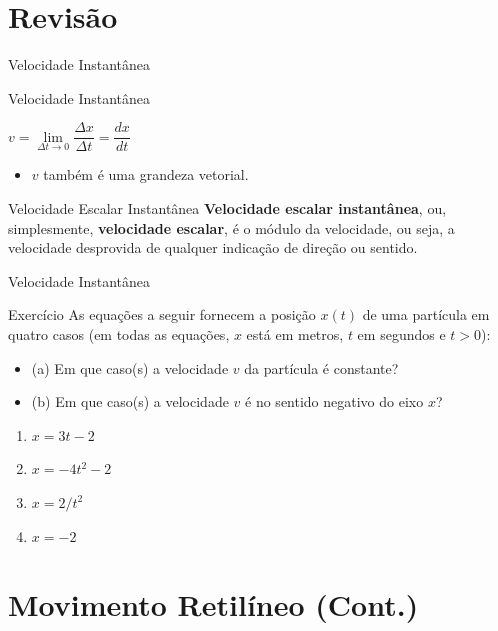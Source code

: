 \documentclass[xcolor=dvipsnames,table]{beamer}
\begin{document}
	\section{Revisão}
	\begin{frame}{Velocidade Instantânea}
		\begin{block}{Velocidade Instantânea}
			\begin{center}
				$v = \underset{\Delta t\rightarrow 0}{\lim} \dfrac{\Delta x}{\Delta t} = \dfrac{dx}{dt}$
			\end{center}
			\begin{itemize}
				\item $v$ também é uma grandeza vetorial.
			\end{itemize}
		\end{block} 
		\begin{block}{Velocidade Escalar Instantânea}
			{\bf Velocidade escalar instantânea}, ou, simplesmente, {\bf velocidade escalar}, é o módulo da velocidade, ou seja, a velocidade desprovida de qualquer indicação de direção ou sentido.
		\end{block}
	\end{frame}

	\begin{frame}{Velocidade Instantânea}
		\begin{block}{Exercício}
			As equações a seguir fornecem a posição $x(t)$ de uma partícula em quatro casos (em todas as equações, $x$ está em metros, $t$ em segundos e $t > 0$): 
				\begin{itemize}
					\item[] (a) Em que caso(s) a velocidade $v$ da partícula é constante?
					\item[] (b) Em que caso(s) a velocidade $v$ é no sentido negativo do eixo $x$?
				\end{itemize}
			\begin{enumerate} 
				\item $x = 3t - 2$
				\item $x = -4t^2 - 2$ 
				\item $x = 2/t^2$ 
				\item $x = -2$ 
			\end{enumerate}
		\end{block}
	\end{frame}

	\section{Movimento Retilíneo (Cont.)}
	
\end{document}
